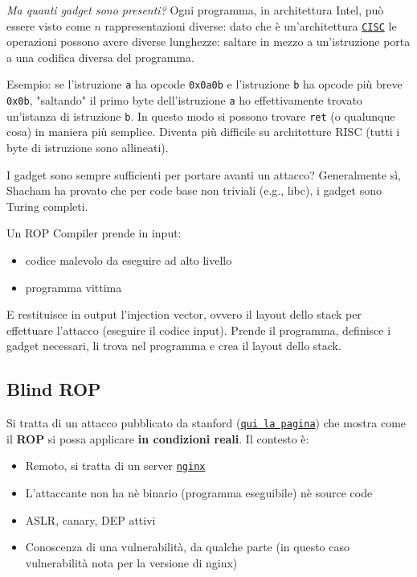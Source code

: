 \textit{Ma quanti gadget sono presenti?} Ogni programma, in architettura Intel, può essere visto come $n$ rappresentazioni diverse: dato che è un'architettura \href{https://it.wikipedia.org/wiki/Complex_instruction_set_computer}{\texttt{CISC}} le operazioni possono avere diverse lunghezze: saltare in mezzo a un'istruzione porta a una codifica diversa del programma.

Esempio: se l'istruzione \texttt{a} ha opcode \texttt{0x0a0b} e l'istruzione \texttt{b} ha opcode più breve \texttt{0x0b}, "saltando" il primo byte dell'istruzione \texttt{a} ho effettivamente trovato un'istanza di istruzione \texttt{b}. In questo modo si possono trovare \texttt{ret} (o qualunque cosa) in maniera più semplice. Diventa più difficile su architetture RISC (tutti i byte di istruzione sono allineati).

I gadget sono sempre sufficienti per portare avanti un attacco? Generalmente sì, Shacham ha provato che per code base non triviali (e.g., libc), i gadget sono Turing completi.

Un ROP Compiler prende in input:
\begin{itemize}
	\item codice malevolo da eseguire ad alto livello
    
	\item programma vittima
\end{itemize}

E restituisce in output l'injection vector, ovvero il layout dello stack per effettuare l'attacco (eseguire il codice input). Prende il programma, definisce i gadget necessari, li trova nel programma e crea il layout dello stack.

\subsection{Blind ROP}

Si tratta di un attacco pubblicato da stanford (\href{http://www.scs.stanford.edu/brop/}{\texttt{qui la pagina}}) che mostra come il \textbf{ROP} si possa applicare \textbf{in condizioni reali}. Il contesto è: 
\begin{itemize}
	\item Remoto, si tratta di un server \href{https://nginx.org/}{\texttt{nginx}}
    
	\item L'attaccante non ha nè binario (programma eseguibile) nè source code
    
	\item ASLR, canary, DEP attivi
    
	\item Conoscenza di una vulnerabilità, da qualche parte (in questo caso vulnerabilità nota per la versione di nginx)
\end{itemize}

